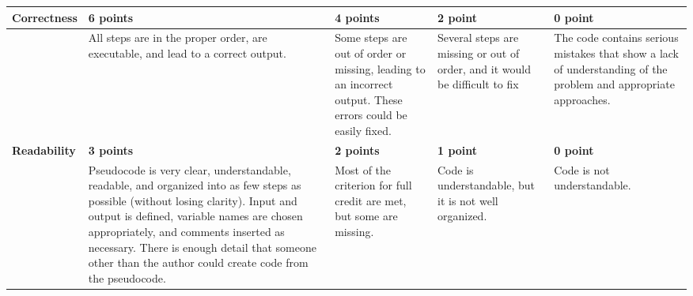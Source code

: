 \documentclass[12pt,landscape]{article}
\begin{document}
{\renewcommand{\arraystretch}{2}
\begin{tabular}{|p{2.3cm}|p{6cm}|p{4.2cm}|p{4.2cm}|p{4.2cm}|}
\hline
{\bf Correctness }& {\bf 6 points} & {\bf 4 points} & {\bf 2 point}& {\bf 0 point} \\
\hline
&All steps are in the proper order, are executable, and lead to a correct output.& Some steps are out of order or missing, leading to an incorrect output. These errors could be easily fixed. & 
Several steps are missing or out of order, and it would be difficult to fix& The code contains serious mistakes that show a lack of understanding of the problem and appropriate approaches.\\
\hline
{\bf Readability }& {\bf 3 points} & {\bf 2 points} & {\bf 1 point}& {\bf 0 point} \\
\hline
& 
 Pseudocode is very clear, understandable, readable, and organized into as few steps as possible (without losing clarity). Input and output is defined, variable names are chosen appropriately, and comments inserted as necessary. There is enough detail that someone other than the author could create code from the pseudocode.& 
 Most of the criterion for full credit are met, but some are missing. & Code is understandable, but it is not well organized. & 
 Code is not understandable.\\
 \hline

 \end{tabular}
}
\end{document}
